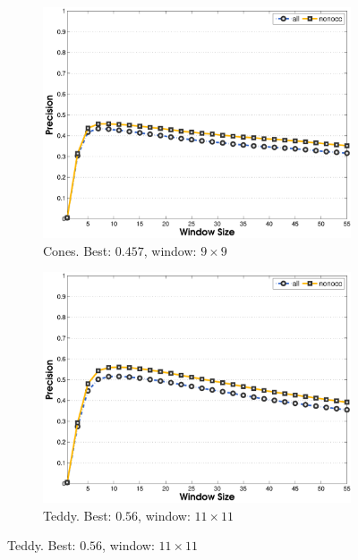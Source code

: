 \documentclass[letterpaper,12pt]{article}
\begin{document}
\begin{figure}[!h]
        \centering
        \begin{subfigure}[b]{0.48\textwidth}
                \includegraphics[width=\textwidth]{fig_w_cones.pdf}
                \caption{Cones. Best: $0.457$, window: $9\times9$}
                \label{fig:pef_cones}
        \end{subfigure}%
        \begin{subfigure}[b]{0.48\textwidth}
                \includegraphics[width=\textwidth]{fig_w_teddy.pdf}
                \caption{Teddy. Best: $0.56$, window: $11\times11$}

\end{subfigure}
\end{figure}
\end{document}
